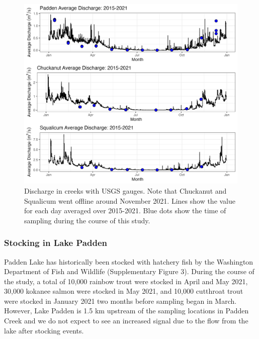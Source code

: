 \documentclass[
]{article}
\begin{document}
\begin{figure}
\centering
\includegraphics{../Output/SupplementalFigures/historical_flow_year_avg_sampling.png}
\caption{Discharge in creeks with USGS gauges. Note that Chuckanut and
Squalicum went offline around November 2021. Lines show the value for
each day averaged over 2015-2021. Blue dots show the time of sampling
during the course of this study.}
\end{figure}

\hypertarget{stocking-in-lake-padden}{%
\subsubsection{Stocking in Lake Padden}\label{stocking-in-lake-padden}}

Padden Lake has historically been stocked with hatchery fish by the
Washington Department of Fish and Wildlife (Supplementary Figure 3).
During the course of the study, a total of 10,000 rainbow trout were
stocked in April and May 2021, 30,000 kokanee salmon were stocked in May
2021, and 10,000 cutthroat trout were stocked in January 2021 two months
before sampling began in March. However, Lake Padden is 1.5 km upstream
of the sampling locations in Padden Creek and we do not expect to see an
increased signal due to the flow from the lake after stocking events.
\end{document}
